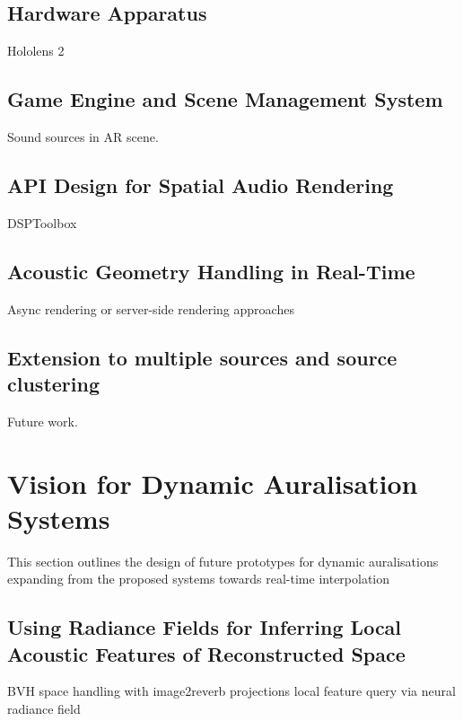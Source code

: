 \subsection{Hardware Apparatus}
Hololens 2

\subsection{Game Engine and Scene Management System}
Sound sources in AR scene.

\subsection{API Design for Spatial Audio Rendering}
DSPToolbox

\subsection{Acoustic Geometry Handling in Real-Time}
Async rendering or server-side rendering approaches

\subsection{Extension to multiple sources and source clustering}
Future work.


\section{Vision for Dynamic Auralisation Systems}
This section outlines the design of future prototypes for dynamic auralisations expanding from the proposed systems towards real-time interpolation 

\subsection{Using Radiance Fields for Inferring Local Acoustic Features of Reconstructed Space}

BVH space handling with image2reverb projections
local feature query via neural radiance field

